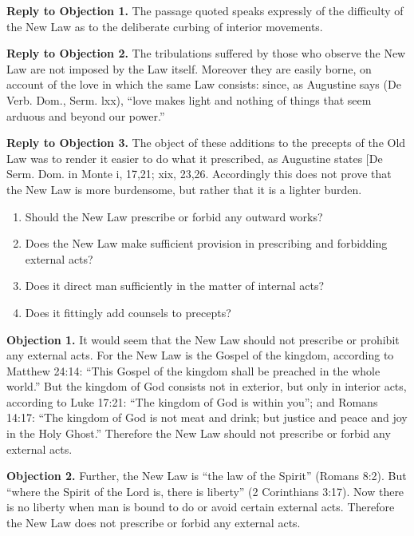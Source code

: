 \textbf{Reply to Objection 1.} The passage quoted speaks expressly of the difficulty of the New Law as to the deliberate curbing of interior movements.

\textbf{Reply to Objection 2.} The tribulations suffered by those who observe the New Law are not imposed by the Law itself. Moreover they are easily borne, on account of the love in which the same Law consists: since, as Augustine says (De Verb. Dom., Serm. lxx), ``love makes light and nothing of things that seem arduous and beyond our power.''

\textbf{Reply to Objection 3.} The object of these additions to the precepts of the Old Law was to render it easier to do what it prescribed, as Augustine states [De Serm. Dom. in Monte i, 17,21; xix, 23,26. Accordingly this does not prove that the New Law is more burdensome, but rather that it is a lighter burden.


\begin{enumerate}

\item  Should the New Law prescribe or forbid any outward works? 
\item  Does the New Law make sufficient provision in prescribing and forbidding external acts? 
\item  Does it direct man sufficiently in the matter of internal acts? 
\item  Does it fittingly add counsels to precepts? 
\end{enumerate}


\textbf{Objection 1.} It would seem that the New Law should not prescribe or prohibit any external acts. For the New Law is the Gospel of the kingdom, according to Matthew 24:14: ``This Gospel of the kingdom shall be preached in the whole world.'' But the kingdom of God consists not in exterior, but only in interior acts, according to Luke 17:21: ``The kingdom of God is within you''; and Romans 14:17: ``The kingdom of God is not meat and drink; but justice and peace and joy in the Holy Ghost.'' Therefore the New Law should not prescribe or forbid any external acts.

\textbf{Objection 2.} Further, the New Law is ``the law of the Spirit'' (Romans 8:2). But ``where the Spirit of the Lord is, there is liberty'' (2 Corinthians 3:17). Now there is no liberty when man is bound to do or avoid certain external acts. Therefore the New Law does not prescribe or forbid any external acts.

